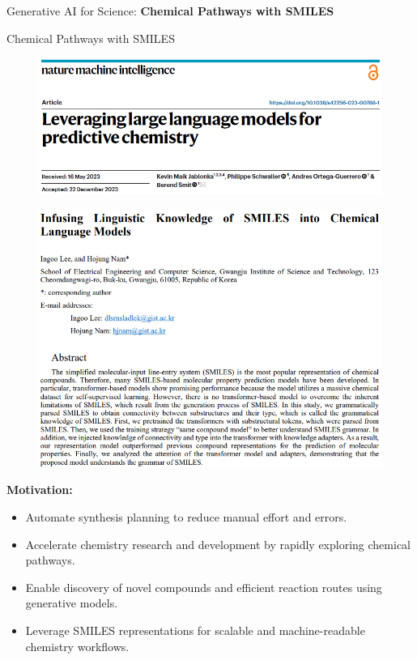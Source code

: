 \begin{frame}{}
    \LARGE Generative AI for Science: \textbf{Chemical Pathways with SMILES}
\end{frame}

\begin{frame}[allowframebreaks]{Chemical Pathways with SMILES}
    \begin{figure}
        \centering
        \includegraphics[height=0.9\textheight,width=1\textwidth,keepaspectratio]{images/science/smile-cover.png}
    \end{figure}

    \framebreak

    \begin{figure}
        \centering
        \includegraphics[height=0.9\textheight,width=1\textwidth,keepaspectratio]{images/science/smile-paper.png}
    \end{figure}

    \framebreak
    \textbf{Motivation:}

    \begin{itemize}
        \item Automate synthesis planning to reduce manual effort and errors.
        \item Accelerate chemistry research and development by rapidly exploring chemical pathways.
        \item Enable discovery of novel compounds and efficient reaction routes using generative models.
        \item Leverage SMILES representations for scalable and machine-readable chemistry workflows.
    \end{itemize}


\end{frame}
